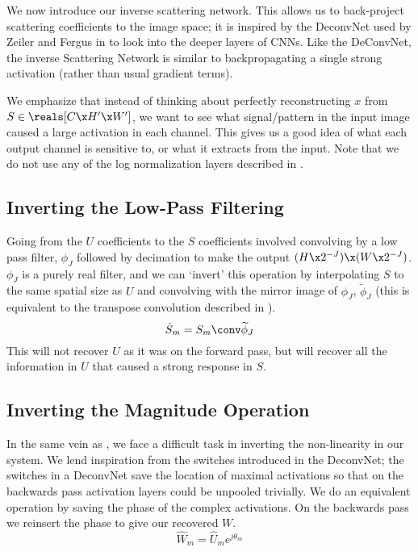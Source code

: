 We now introduce our inverse scattering network. This allows us to back-project
scattering coefficients to the image space; it is inspired by the
DeconvNet used by Zeiler and Fergus in
\cite{zeiler_visualizing_2014} to look into the deeper layers of CNNs. Like
the DeConvNet, the inverse Scattering Network is similar to backpropagating a
single strong activation (rather than usual gradient terms). 

We emphasize that instead of thinking about perfectly reconstructing $x$ from
$S\in \reals[C\x H'\x W']$, we want to see what signal/pattern in the input image caused
a large activation in each channel. This gives us a good idea of what each
output channel is sensitive to, or what it extracts from the input. 
Note that we do not use any of the log normalization layers described in
\cite{oyallon_deep_2015, singh_dual-tree_2017}.

\subsection{Inverting the Low-Pass Filtering}
Going from the $U$ coefficients to the $S$ coefficients involved convolving by
a low pass filter, $\phi_J$ followed by decimation to make the output $(H\x
2^{-J})\x (W\x2^{-J})$.  $\phi_J$ is a purely real filter, and we can `invert'
this operation by interpolating $S$ to the same spatial size as $U$ and convolving with
the mirror image of $\phi_J$, $\widetilde{\phi}_J$ (this is equivalent to the
transpose convolution described in \cite{zeiler_visualizing_2014}). 
\begin{equation}
  \label{eq:ch4:s_hat}
  \hat{S}_{m} = S_{m} \conv \widetilde{\phi}_J
\end{equation}
This will not recover $U$ as it was on the forward pass, but will recover all
the information in $U$ that caused a strong response in $S$. 

\subsection{Inverting the Magnitude Operation}
In the same vein as \cite{zeiler_visualizing_2014}, we face a difficult
task in inverting the non-linearity in our system. 
We lend inspiration from the switches introduced in the DeconvNet; the
switches in a DeconvNet save the location of maximal activations so that
on the backwards pass activation layers could be unpooled trivially. We do an
equivalent operation by saving the phase of the complex activations. On the
backwards pass we reinsert the phase to give our recovered $W$. 
\begin{equation}
  \label{eq:ch4:w_hat}
  \hat{W}_{m} = \hat{U}_{m}e^{j\theta_{m}}
\end{equation}


